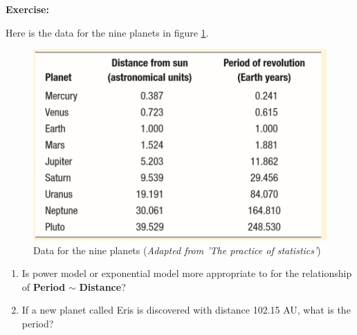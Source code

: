 \documentclass[a4paper, 12pt,twoside]{book}
\begin{document}
\colorbox{champagne}{
\begin{minipage}{\textwidth}
\textbf{Exercise:}

Here is the data for the nine planets in figure \ref{Planets}.

\begin{figure}[H]
\centering
\includegraphics[scale=0.5]{Planets.png}
\caption{Data for the nine planets (\textit{Adapted from 'The practice of statistics'})}
\label{Planets}
\end{figure}
\begin{enumerate}[(1)]
\item Is power model or exponential model more appropriate to for the relationship of \textbf{Period} $\sim$ \textbf{Distance}?
\item If a new planet called Eris is discovered with distance 102.15 AU, what is the period?
\end{enumerate}
\end{minipage}
}
\end{document}
